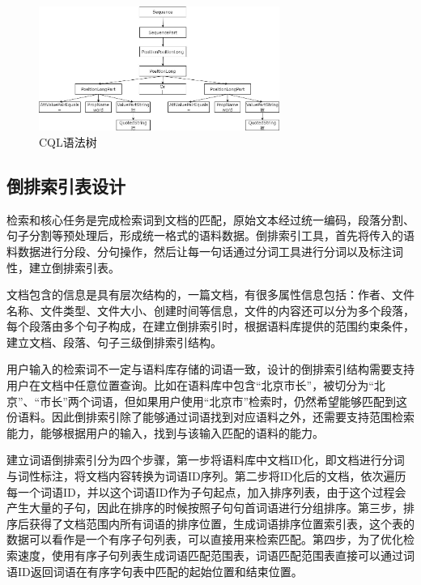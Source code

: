 \documentclass[11pt]{article}
\begin{document}
\begin{CJK*}{UTF8}{gbsn}
\begin{figure}[!h]
	\centering
	\includegraphics[width=0.7\textwidth]{image/yufashu.jpg}
	\caption{CQL语法树}
	\label{fig:yufashu}
\end{figure}

\subsection{倒排索引表设计}

检索和核心任务是完成检索词到文档的匹配，原始文本经过统一编码，段落分割、句子分割等预处理后，形成统一格式的语料数据。倒排索引工具，首先将传入的语料数据进行分段、分句操作，然后让每一句话通过分词工具进行分词以及标注词性，建立倒排索引表。

文档包含的信息是具有层次结构的，一篇文档，有很多属性信息包括：作者、文件名称、文件类型、文件大小、创建时间等信息，文件的内容还可以分为多个段落，每个段落由多个句子构成，在建立倒排索引时，根据语料库提供的范围约束条件，建立文档、段落、句子三级倒排索引结构。

用户输入的检索词不一定与语料库存储的词语一致，设计的倒排索引结构需要支持用户在文档中任意位置查询。比如在语料库中包含“北京市长”，被切分为“北京”、“市长”两个词语，但如果用户使用“北京市”检索时，仍然希望能够匹配到这份语料。因此倒排索引除了能够通过词语找到对应语料之外，还需要支持范围检索能力，能够根据用户的输入，找到与该输入匹配的语料的能力。

建立词语倒排索引分为四个步骤，第一步将语料库中文档ID化，即文档进行分词与词性标注，将文档内容转换为词语ID序列。第二步将ID化后的文档，依次遍历每一个词语ID，并以这个词语ID作为子句起点，加入排序列表，由于这个过程会产生大量的子句，因此在排序的时候按照子句句首词语进行分组排序。第三步，排序后获得了文档范围内所有词语的排序位置，生成词语排序位置索引表，这个表的数据可以看作是一个有序子句列表，可以直接用来检索匹配。第四步，为了优化检索速度，使用有序子句列表生成词语匹配范围表，词语匹配范围表直接可以通过词语ID返回词语在有序字句表中匹配的起始位置和结束位置。


\end{CJK*}
\end{document}
